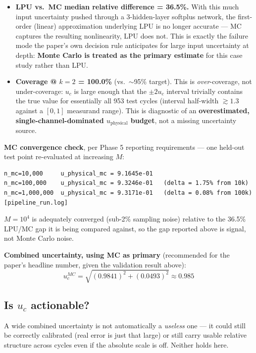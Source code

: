 \documentclass[11pt]{article}
\begin{document}
\begin{itemize}
\item \textbf{LPU vs.\ MC median relative difference = 36.5\%.} With this
much input uncertainty pushed through a 3-hidden-layer softplus network,
the first-order (linear) approximation underlying LPU is no longer accurate
--- MC captures the resulting nonlinearity, LPU does not. This is exactly
the failure mode the paper's own decision rule anticipates for large input
uncertainty at depth: \textbf{Monte Carlo is treated as the primary
estimate} for this case study rather than LPU.
\item \textbf{Coverage @ $k=2$ = 100.0\%} (vs.\ $\sim$95\% target). This is
\emph{over}-coverage, not under-coverage: $u_c$ is large enough that the
$\pm 2u_c$ interval trivially contains the true value for essentially all
953 test cycles (interval half-width $\gtrsim 1.3$ against a $[0,1]$
measurand range). This is diagnostic of an \textbf{overestimated,
single-channel-dominated $u_{\mathrm{physical}}$ budget}, not a missing uncertainty source.
\end{itemize}

\textbf{MC convergence check}, per Phase 5 reporting requirements --- one
held-out test point re-evaluated at increasing $M$:

\begin{verbatim}
n_mc=10,000     u_physical_mc = 9.1645e-01
n_mc=100,000    u_physical_mc = 9.3246e-01   (delta = 1.75% from 10k)
n_mc=1,000,000  u_physical_mc = 9.3171e-01   (delta = 0.08% from 100k)   [pipeline_run.log]
\end{verbatim}

$M=10^4$ is adequately converged (sub-2\% sampling noise) relative to the
36.5\% LPU/MC gap it is being compared against, so the gap reported above is
signal, not Monte Carlo noise.

\textbf{Combined uncertainty, using MC as primary} (recommended for the
paper's headline number, given the validation result above):
\[
u_c^{MC} = \sqrt{(0.9841)^2 + (0.0493)^2} \approx 0.985
\]

\subsection{Is $u_c$ actionable?}
\label{sec:uc-actionable}

A wide combined uncertainty is not automatically a \emph{useless} one --- it
could still be correctly calibrated (real error is just that large) or
still carry usable relative structure across cycles even if the absolute
scale is off. Neither holds here.
\end{document}
